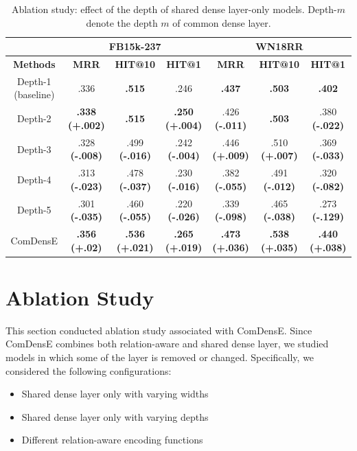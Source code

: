 \begin{table}
\centering
\caption{Ablation study: effect of the depth of shared dense layer-only models. Depth-$m$ denote the depth $m$ of common dense layer.}
\label{table8}
\begin{tabular}{cccc|ccc}
\hline
 & \multicolumn{3}{c}{\textbf{FB15k-237}} & \multicolumn{3}{c}{\textbf{WN18RR}}\\
 \hline
 \textbf{Methods} &
 \textbf{MRR} &
 \textbf{HIT@10} &
 \textbf{HIT@1} &
 \textbf{MRR} &
 \textbf{HIT@10} &
 \textbf{HIT@1} \\
 \hline
 Depth-1 (baseline) & .336 & \textbf{.515}  & .246 & \textbf{.437} & \textbf{.503} & \textbf{.402}\\
 \hline
 Depth-2 & \textbf{.338} \textbf{(+.002)} & \textbf{.515} & \textbf{.250} \textbf{(+.004)} & .426 \textbf{(-.011)} & \textbf{.503} & .380 \textbf{(-.022)}\\
 Depth-3 & .328 \textbf{(-.008)} & .499 \textbf{(-.016)} & .242 \textbf{(-.004)} & .446 \textbf{(+.009)} & .510 \textbf{(+.007)} & .369 \textbf{(-.033)}\\
 Depth-4 & .313 \textbf{(-.023)} & .478 \textbf{(-.037)} & .230 \textbf{(-.016)} & .382 \textbf{(-.055)} & .491 \textbf{(-.012)} & .320 \textbf{(-.082)}\\
 Depth-5 & .301 \textbf{(-.035)} & .460 \textbf{(-.055)} & .220 \textbf{(-.026)} & .339 \textbf{(-.098)} & .465 \textbf{(-.038)} & .273 \textbf{(-.129)}\\
 \hline
  ComDensE & \textbf{.356 (+.02)}  &  \textbf{.536 (+.021)} & \textbf{.265 (+.019)} & \textbf{.473 (+.036)}  & \textbf{.538 (+.035)} & \textbf{.440 (+.038)}\\
 \hline
\end{tabular}
\end{table}

\section{Ablation Study}
This section conducted ablation study associated with ComDensE. Since ComDensE combines both relation-aware and shared dense layer, we studied models in which some of the layer is removed or changed. Specifically, we considered the following configurations:
\begin{itemize}
		\item Shared dense layer only with varying widths
		\item Shared dense layer only with varying depths
		\item Different relation-aware encoding functions
	\end{itemize}
	

